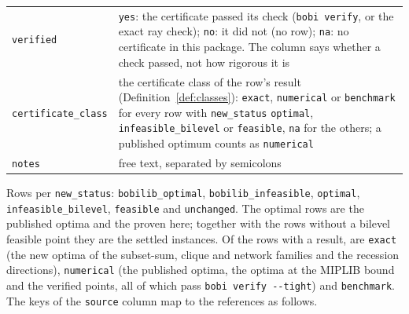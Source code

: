 \begin{center}
\begin{tabular}{@{}p{1.5in}p{4.8in}@{}}
\texttt{verified} & \texttt{yes}: the certificate passed its check (\texttt{bobi verify}, or the exact ray check); \texttt{no}: it did not (no row); \texttt{na}: no certificate in this package. The column says whether a check passed, not how rigorous it is\\
\texttt{certificate\_class} & the certificate class of the row's result (Definition~\ref{def:classes}): \texttt{exact}, \texttt{numerical} or \texttt{benchmark} for every row with \texttt{new\_status} \texttt{optimal}, \texttt{infeasible\_bilevel} or \texttt{feasible}, \texttt{na} for the others; a published optimum counts as \texttt{numerical}\\
\texttt{notes} & free text, separated by semicolons\\
\bottomrule
\end{tabular}
\end{center}

\noindent Rows per \texttt{new\_status}: \NumBobiOptimal{} \texttt{bobilib\_optimal},
\NumBobiInfeasible{} \texttt{bobilib\_infeasible}, \NumOptimalNow{} \texttt{optimal},
\NumNoFeasible{} \texttt{infeasible\_bilevel}, \NumFirstPoint{} \texttt{feasible}
and \NumUnchanged{} \texttt{unchanged}. The \NumOptimalNow{} optimal rows are the
\NumLitOptimal{} published optima and the \NumNewOptimal{} proven here; together
with the \NumNoFeasible{} rows without a bilevel feasible point they are the
\NumSettled{} settled instances. Of the \NumClassRows{} rows with a result,
\NumClassExact{} are \texttt{exact} (the \NumClassExactNew{} new optima of the
subset-sum, clique and network families and the \NumNoFeasible{} recession
directions), \NumClassNumerical{} \texttt{numerical} (the \NumLitOptimal{}
published optima, the \NumNewHpr{} optima at the MIPLIB bound and the
\NumFirstPoint{} verified points, all of which pass \texttt{bobi verify -{}-tight})
and \NumClassBenchmark{} \texttt{benchmark}. The keys of the \texttt{source}
column map to the references as follows.

